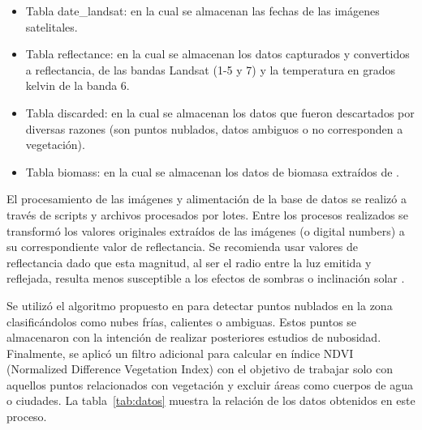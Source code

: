 \begin{itemize}
 \item Tabla date\_landsat: en la cual se almacenan las fechas de las imágenes satelitales.
 \item Tabla reflectance: en la cual se almacenan los datos capturados y convertidos a reflectancia, de las bandas Landsat (1-5 y 7) y la temperatura en grados kelvin de la banda 6.
 \item Tabla discarded: en la cual se almacenan los datos que fueron descartados por diversas razones (son puntos nublados, datos ambiguos o no corresponden a vegetación).
 \item Tabla biomass: en la cual se almacenan los datos de biomasa extraídos de \cite{baccini2008afirst}.
\end{itemize}

El procesamiento de las imágenes y alimentación de la base de datos se realizó a través de scripts y archivos procesados por lotes.  Entre los procesos realizados se transformó los valores originales extraídos de las imágenes (o digital numbers) a su correspondiente valor de reflectancia. Se recomienda usar valores de reflectancia dado que esta magnitud, al ser el radio entre la luz emitida y reflejada, resulta menos susceptible a los efectos de sombras o inclinación solar \cite{chander_summary_2009}. 

Se utilizó el algoritmo propuesto en \cite{irish2000landsat} para detectar puntos nublados en la zona clasificándolos como nubes frías, calientes o ambiguas.  Estos puntos se almacenaron con la intención de realizar posteriores estudios de nubosidad.  Finalmente, se aplicó un filtro adicional para calcular en índice NDVI (Normalized Difference Vegetation Index) con el objetivo de trabajar solo con aquellos puntos relacionados con vegetación y excluir áreas como cuerpos de agua o ciudades.  La tabla~\ref{tab:datos} muestra la relación de los datos obtenidos en este proceso.

